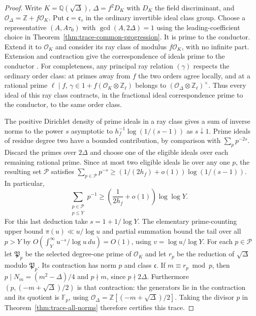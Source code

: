 \documentclass[11pt]{amsart}
\theoremstyle{definition}
\theoremstyle{remark}
\numberwithin{equation}{section}
\newcommand{\Q}{\mathbb{Q}}
\newcommand{\Z}{\mathbb{Z}}
\begin{document}
\begin{proof}
Write $K=\Q(\sqrt\Delta)$, $\Delta=f^2D_K$ with $D_K$ the
field discriminant, and $\mathcal O_\Delta=\Z+f\mathcal O_K$.
Put $\mathfrak c=\mathfrak c_\tau$ in the ordinary invertible ideal
class group. Choose a representative $(A,A\tau_0)$ with
$\gcd(A,2\Delta)=1$ using the leading-coefficient choice in
Theorem~\ref{thm:trace-common-progression}. It is prime to the conductor.
Extend it to $\mathcal O_K$ and consider its ray class of modulus
$f\mathcal O_K$, with no infinite part.
Extension and contraction give the correspondence of ideals
prime to the conductor \cite[Theorem~3.8]{ConradConductor}.
For completeness, any principal ray relation $(\gamma)$ respects
the ordinary order class: at primes away from $f$ the two orders
agree locally, and at a rational prime $\ell\mid f$,
$\gamma\in1+f(\mathcal O_K\otimes\Z_\ell)$ belongs to
$(\mathcal O_\Delta\otimes\Z_\ell)^\times$.
Thus every ideal of this ray class contracts, in the fractional
ideal correspondence prime to the conductor, to the same order class.

The positive Dirichlet density of prime ideals in a ray class
\cite[Chapter~VII, Section~13]{NeukirchANT} gives a sum of
inverse norms to the power $s$ asymptotic to
$h_f^{-1}\log(1/(s-1))$ as $s\downarrow1$.
Prime ideals of residue degree two have a bounded contribution,
by comparison with $\sum_p p^{-2s}$.
Discard the primes over $2\Delta$ and choose one of the eligible
ideals over each remaining rational prime. Since at most two
eligible ideals lie over any one $p$, the resulting set
$\mathcal P$ satisfies
$\sum_{p\in\mathcal P}p^{-s}\ge
 (1/(2h_f)+o(1))\log(1/(s-1))$.
In particular,
\begin{equation}\label{eq:trace-primes-reciprocal}
 \sum_{\substack{p\in\mathcal P\\p\le Y}}p^{-1}
           \ge\left(\frac{1}{2h_f}+o(1)\right)\log\log Y.
\end{equation}
For this last deduction take $s=1+1/\log Y$. The elementary
prime-counting upper bound $\pi(u)\ll u/\log u$ and partial
summation bound the tail over all $p>Y$ by
$O(\int_Y^\infty u^{-s}/\log u\,du)=O(1)$, using
$v=\log u/\log Y$.
For each $p\in\mathcal P$ let $\mathfrak P_p$ be the selected
degree-one prime of $\mathcal O_K$ and let
$r_p$ be the reduction of $\sqrt\Delta$ modulo $\mathfrak P_p$.
Its contraction has norm $p$ and class $\mathfrak c$.
If $m\equiv r_p\bmod p$, then
$p\mid N_m=(m^2-\Delta)/4$ and $p\nmid m$, since $p\nmid2\Delta$.
Furthermore $(p,(-m+\sqrt\Delta)/2)$ is that contraction:
the generators lie in the contraction and its quotient is
$\mathbb F_p$, using $\mathcal O_\Delta=\Z[(-m+\sqrt\Delta)/2]$.
Taking the divisor $p$ in Theorem~\ref{thm:trace-all-norms}
therefore certifies this trace.


\end{proof}
\end{document}
